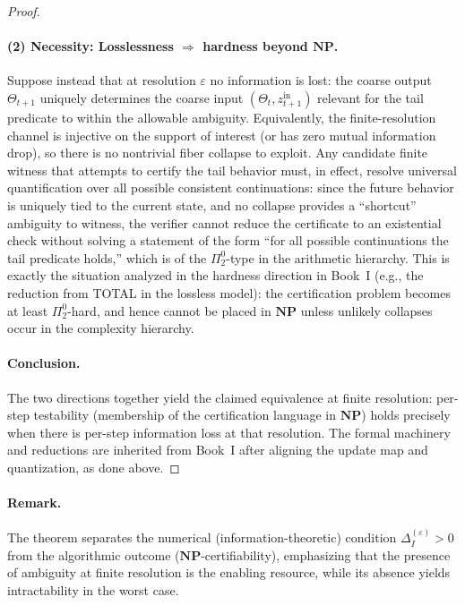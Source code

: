 \documentclass[12pt]{article}
\theoremstyle{definition}
\theoremstyle{plain}
\begin{document}
\begin{proof}
\paragraph{(2) Necessity: Losslessness \(\Rightarrow\) hardness beyond \(\mathbf{NP}\).}  
Suppose instead that at resolution \(\varepsilon\) no information is lost: the coarse output \(\Theta_{t+1}\) uniquely determines the coarse input \((\Theta_t,z_{t+1}^{\mathrm{in}})\) relevant for the tail predicate to within the allowable ambiguity. Equivalently, the finite-resolution channel is injective on the support of interest (or has zero mutual information drop), so there is no nontrivial fiber collapse to exploit. Any candidate finite witness that attempts to certify the tail behavior must, in effect, resolve universal quantification over all possible consistent continuations: since the future behavior is uniquely tied to the current state, and no collapse provides a “shortcut” ambiguity to witness, the verifier cannot reduce the certificate to an existential check without solving a statement of the form “for all possible continuations the tail predicate holds,” which is of the \(\Pi^0_2\)-type in the arithmetic hierarchy. This is exactly the situation analyzed in the hardness direction in Book~I (e.g., the reduction from \textsc{TOTAL} in the lossless model): the certification problem becomes at least \(\Pi^0_2\)-hard, and hence cannot be placed in \(\mathbf{NP}\) unless unlikely collapses occur in the complexity hierarchy. 

\paragraph{Conclusion.}  
The two directions together yield the claimed equivalence at finite resolution: per-step testability (membership of the certification language in \(\mathbf{NP}\)) holds precisely when there is per-step information loss at that resolution. The formal machinery and reductions are inherited from Book~I after aligning the update map and quantization, as done above.
\end{proof}


\paragraph{Remark.} The theorem separates the numerical (information-theoretic) condition \(\Delta_I^{(\varepsilon)}>0\) from the algorithmic outcome (\(\mathbf{NP}\)-certifiability), emphasizing that the presence of ambiguity at finite resolution is the enabling resource, while its absence yields intractability in the worst case.  
\end{document}
